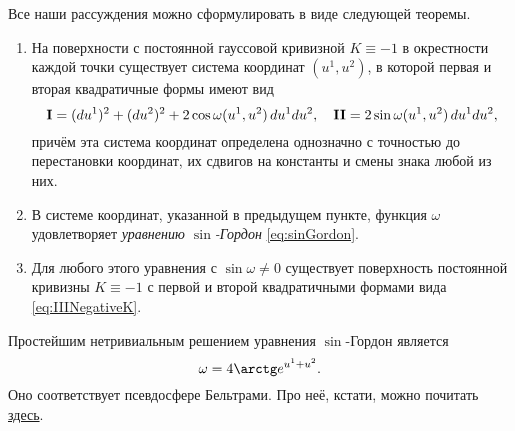 Все наши рассуждения можно сформулировать в виде следующей теоремы.

\begin{theorem}
	\begin{enumerate}[nolistsep, label=(\arabic*)]
		\item На поверхности с постоянной гауссовой кривизной $K \equiv -1$ в окрестности каждой точки существует система координат $(u^1, u^2)$, в которой первая и вторая квадратичные формы имеют вид
			\begin{equation} \label{eq:IIINegativeK}
				\boldsymbol{\operatorname{I}} = (du^1)^2 + (du^2)^2 + 2\cos\omega(u^1, u^2)\,du^1du^2,\quad \boldsymbol{\operatorname{II}} = 2\sin\omega(u^1, u^2)\,du^1du^2,
			\end{equation}
			причём эта система координат определена однозначно с точностью до перестановки координат, их сдвигов на константы и смены знака любой из них.
		\item В системе координат, указанной в предыдущем пункте, функция $\omega$ удовлетворяет \textit{уравнению $\sin$-Гордон}\footnotemark{} \eqref{eq:sinGordon}.
		\item Для любого этого уравнения с $\sin\omega \ne 0$ существует поверхность постоянной кривизны $K \equiv -1$ с первой и второй квадратичными формами вида \eqref{eq:IIINegativeK}.
	\end{enumerate}
\end{theorem}


Простейшим нетривиальным решением уравнения $\sin$-Гордон является
\[
	\omega = 4\arctg e^{u^1 + u^2}.
\]
Оно соответствует псевдосфере Бельтрами. Про неё, кстати, можно почитать \href{https://etudes.ru/models/pseudosphere-constant-negative-curvature/?ref=calso}{здесь}.

